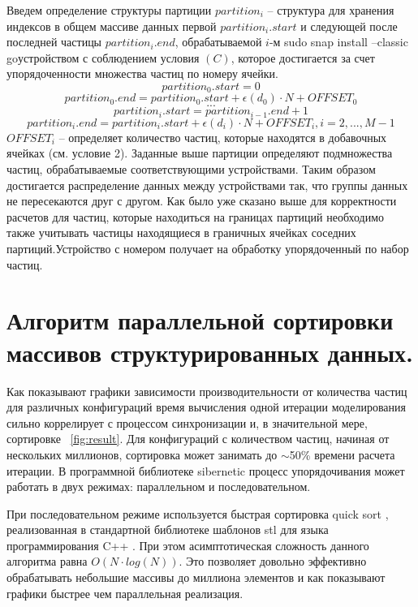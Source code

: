 Введем определение структуры партиции \(partition_i\) – структура для хранения индексов в общем массиве данных первой \(partition_{i}.start\) и следующей после последней частицы \(partition_{i}.end\), обрабатываемой \(i\)-м sudo snap install --classic goустройством с соблюдением условия
\((C)\), которое достигается за счет упорядоченности множества частиц по номеру ячейки.
\[
  partition_{0}.start = 0
\]
\[
  partition_{0}.end = partition_{0}.start + \epsilon (d_0) \cdot N + OFFSET_0
\]
\[
  ...
\]
\[
  partition_{i}.start = partition_{i-1}.end + 1
\]
\[
  partition_{i}.end = partition_{i}.start + \epsilon (d_i) \cdot N + OFFSET_i, i=2,..., M - 1
\]
\(OFFSET_i\) – определяет количество частиц, которые находятся в добавочных ячейках (см. условие 2).
Заданные выше партиции определяют подмножества частиц, обрабатываемые соответствующими устройствами. Таким образом достигается распределение данных между устройствами так, что группы данных не пересекаются друг с другом. Как было уже сказано выше для корректности расчетов для частиц, которые находиться на границах партиций необходимо также учитывать частицы находящиеся в граничных ячейках соседних партиций.Устройство с номером  получает на обработку упорядоченный по  набор частиц. 

\section{Алгоритм параллельной сортировки массивов структурированных данных.}\label{sec:ch3/sect2}

Как показывают графики зависимости производительности от количества частиц для различных конфигураций время вычисления одной итерации моделирования сильно коррелирует с процессом синхронизации и, в значительной мере, сортировке ~\ref{fig:result}. Для  конфигураций с количеством частиц, начиная от нескольких миллионов, сортировка может занимать до \(\sim \)50\% времени расчета итерации. В программной библиотеке sibernetic \cite{Palyanov2016} процесс упорядочивания может работать в двух режимах: параллельном и последовательном.

При последовательном режиме используется быстрая сортировка quick sort \cite{Hoare1962}, реализованная в стандартной библиотеке шаблонов stl \cite{Stepanov1995} для языка программирования C++ \cite{Stroustrup2013}. При этом асимптотическая сложность данного алгоритма равна \( O(N \cdot log(N)) \). Это позволяет довольно эффективно обрабатывать небольшие массивы до миллиона элементов и как показывают графики быстрее чем параллельная реализация.

